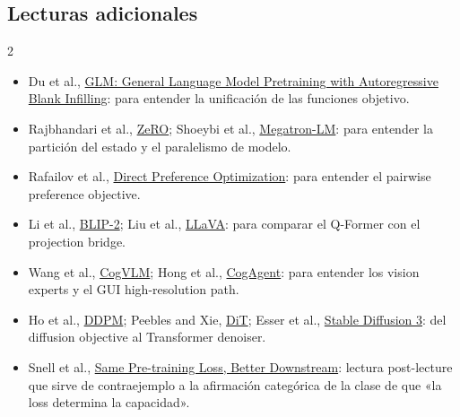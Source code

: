 \documentclass[a4paper]{article}
\begin{document}
\subsection{Lecturas adicionales}

\begin{multicols}{2}
\footnotesize
\begin{itemize}
  \setlength{\itemsep}{0.15em}
  \setlength{\parskip}{0pt}
  \item Du et al., \href{https://arxiv.org/abs/2103.10360}{GLM: General Language Model Pretraining with Autoregressive Blank Infilling}: para entender la unificación de las funciones objetivo.
  \item Rajbhandari et al., \href{https://arxiv.org/abs/1910.02054}{ZeRO}; Shoeybi et al., \href{https://arxiv.org/abs/1909.08053}{Megatron-LM}: para entender la partición del estado y el paralelismo de modelo.
  \item Rafailov et al., \href{https://arxiv.org/abs/2305.18290}{Direct Preference Optimization}: para entender el pairwise preference objective.
  \item Li et al., \href{https://arxiv.org/abs/2301.12597}{BLIP-2}; Liu et al., \href{https://arxiv.org/abs/2304.08485}{LLaVA}: para comparar el Q-Former con el projection bridge.
  \item Wang et al., \href{https://arxiv.org/abs/2311.03079}{CogVLM}; Hong et al., \href{https://arxiv.org/abs/2312.08914}{CogAgent}: para entender los vision experts y el GUI high-resolution path.
  \item Ho et al., \href{https://arxiv.org/abs/2006.11239}{DDPM}; Peebles and Xie, \href{https://arxiv.org/abs/2212.09748}{DiT}; Esser et al., \href{https://arxiv.org/abs/2403.03206}{Stable Diffusion 3}: del diffusion objective al Transformer denoiser.
  \item Snell et al., \href{https://arxiv.org/abs/2409.01236}{Same Pre-training Loss, Better Downstream}: lectura post-lecture que sirve de contraejemplo a la afirmación categórica de la clase de que «la loss determina la capacidad».
\end{itemize}
\end{multicols}
\end{document}
